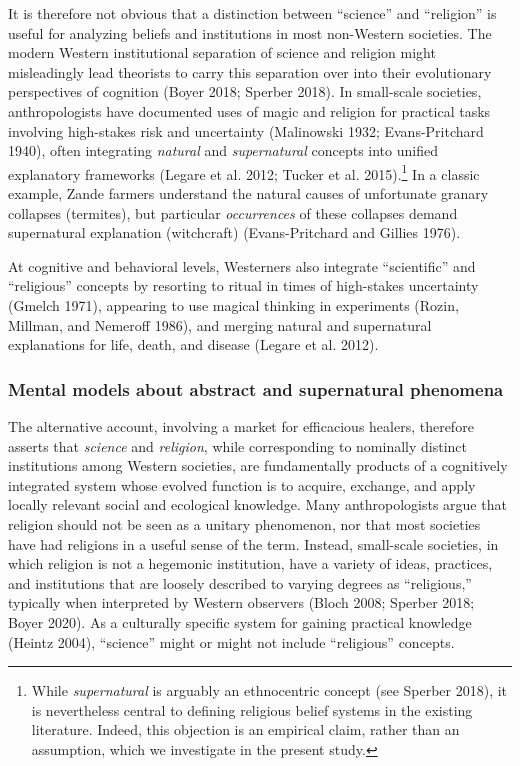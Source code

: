 \documentclass[
  11pt,
]{article}
\begin{document}
It is therefore not obvious that a distinction between ``science'' and ``religion'' is useful for analyzing beliefs and institutions in most non-Western societies. The modern Western institutional separation of science and religion might misleadingly lead theorists to carry this separation over into their evolutionary perspectives of cognition (Boyer 2018; Sperber 2018). In small-scale societies, anthropologists have documented uses of magic and religion for practical tasks involving high-stakes risk and uncertainty (Malinowski 1932; Evans-Pritchard 1940), often integrating \emph{natural} and \emph{supernatural} concepts into unified explanatory frameworks (Legare et al. 2012; Tucker et al. 2015).\footnote{While \emph{supernatural} is arguably an ethnocentric concept (see Sperber 2018), it is nevertheless central to defining religious belief systems in the existing literature. Indeed, this objection is an empirical claim, rather than an assumption, which we investigate in the present study.} In a classic example, Zande farmers understand the natural causes of unfortunate granary collapses (termites), but particular \emph{occurrences} of these collapses demand supernatural explanation (witchcraft) (Evans-Pritchard and Gillies 1976).

At cognitive and behavioral levels, Westerners also integrate ``scientific'' and ``religious'' concepts by resorting to ritual in times of high-stakes uncertainty (Gmelch 1971), appearing to use magical thinking in experiments (Rozin, Millman, and Nemeroff 1986), and merging natural and supernatural explanations for life, death, and disease (Legare et al. 2012).

\hypertarget{mental-models-about-abstract-and-supernatural-phenomena}{%
\subsubsection{Mental models about abstract and supernatural phenomena}\label{mental-models-about-abstract-and-supernatural-phenomena}}

The alternative account, involving a market for efficacious healers, therefore asserts that \emph{science} and \emph{religion}, while corresponding to nominally distinct institutions among Western societies, are fundamentally products of a cognitively integrated system whose evolved function is to acquire, exchange, and apply locally relevant social and ecological knowledge. Many anthropologists argue that religion should not be seen as a unitary phenomenon, nor that most societies have had religions in a useful sense of the term. Instead, small-scale societies, in which religion is not a hegemonic institution, have a variety of ideas, practices, and institutions that are loosely described to varying degrees as ``religious,'' typically when interpreted by Western observers (Bloch 2008; Sperber 2018; Boyer 2020). As a culturally specific system for gaining practical knowledge (Heintz 2004), ``science'' might or might not include ``religious'' concepts.
\end{document}
